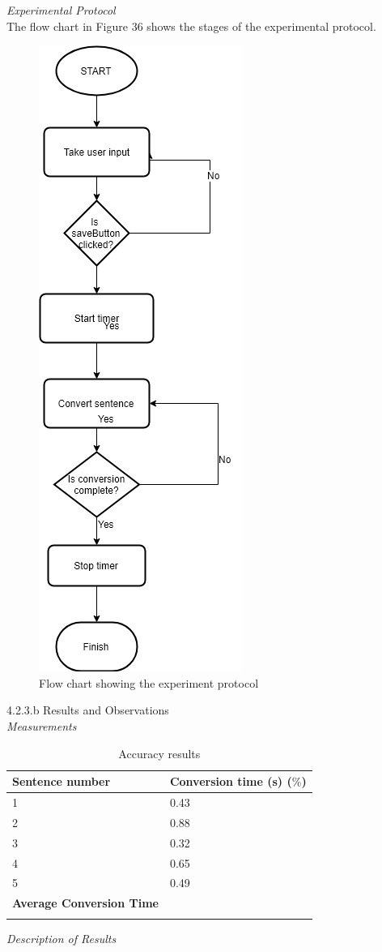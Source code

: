 \textit{Experimental Protocol}\\
The flow chart in Figure 36 shows the stages of the experimental protocol. 
\newpage
\begin{figure}[h]
	\centering
	\includegraphics[scale=0.5]{50}
	\caption{Flow chart showing the experiment protocol}
\end{figure}

4.2.3.b Results and Observations\\
\textit{Measurements}\\
\begin{center}
	\begin{longtable}{|p{5cm}|p{5cm}|}
		\hline
		\textbf{Sentence number} &
		\textbf{Conversion time (s) ($\%$)} \\
		\hline
		1
		&
		0.43
		\\
		\hline
		2
		&
		0.88
		\\
		\hline
		3
		&
		0.32
		\\
		\hline
		4
		&
		0.65
		\\
		\hline
		5
		&
		0.49
		\\
		\hline
		\textbf{Average Conversion Time}
		&
		
		\\
		\hline		
		\caption{Accuracy results}
	\end{longtable}
\end{center}

\textit{Description of Results}\\

\newpage



